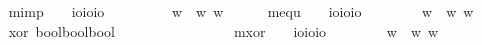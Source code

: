 \begin{isabellebody}
\ \ \isamarkupfalse%
\ mimp\ \ \ {\isacharcolon}{\isacharcolon}\ {\isachardoublequoteopen}io{\isasymRightarrow}io{\isasymRightarrow}io{\isachardoublequoteclose}\ {\isacharparenleft}\ \isanewline
\ \ \ \ \ {\isachardoublequoteopen}{\isasymphi}\isactrlbold {\isasymrightarrow}{\isasympsi}\ {\isasymequiv}\ {\isasymlambda}w{\isachardot}\ {\isacharparenleft}{\isasymphi}\ w{\isacharparenright}{\isasymlongrightarrow}{\isacharparenleft}{\isasympsi}\ w{\isacharparenright}{\isachardoublequoteclose}\ \ \isanewline
\ \ \isamarkupfalse%
\ mequ\ \ \ {\isacharcolon}{\isacharcolon}\ {\isachardoublequoteopen}io{\isasymRightarrow}io{\isasymRightarrow}io{\isachardoublequoteclose}\ {\isacharparenleft}\isanewline
\ \ \ \ \ {\isachardoublequoteopen}{\isasymphi}\isactrlbold {\isasymleftrightarrow}{\isasympsi}\ {\isasymequiv}\ {\isasymlambda}w{\isachardot}\ {\isacharparenleft}{\isasymphi}\ w{\isacharparenright}{\isasymlongleftrightarrow}{\isacharparenleft}{\isasympsi}\ w{\isacharparenright}{\isachardoublequoteclose}\isanewline
\ \ \isamarkupfalse%
\ xor{\isacharcolon}{\isacharcolon}\ {\isachardoublequoteopen}bool{\isasymRightarrow}bool{\isasymRightarrow}bool{\isachardoublequoteclose}\ {\isacharparenleft}\isanewline
\ \ \ \ \ {\isachardoublequoteopen}{\isasymphi}{\isasymoplus}{\isasympsi}\ {\isasymequiv}\ \ {\isacharparenleft}{\isasymphi}{\isasymor}{\isasympsi}{\isacharparenright}\ {\isasymand}\ {\isasymnot}{\isacharparenleft}{\isasymphi}{\isasymand}{\isasympsi}{\isacharparenright}{\isachardoublequoteclose}\ \isanewline
\ \ \isamarkupfalse%
\ mxor\ \ \ {\isacharcolon}{\isacharcolon}\ {\isachardoublequoteopen}io{\isasymRightarrow}io{\isasymRightarrow}io{\isachardoublequoteclose}\ {\isacharparenleft}\isanewline
\ \ \ \ \ {\isachardoublequoteopen}{\isasymphi}\isactrlbold {\isasymoplus}{\isasympsi}\ {\isasymequiv}\ {\isasymlambda}w{\isachardot}\ {\isacharparenleft}{\isasymphi}\ w{\isacharparenright}{\isasymoplus}{\isacharparenleft}{\isasympsi}\ w{\isacharparenright}{\isachardoublequoteclose}%

\end{isabellebody}
